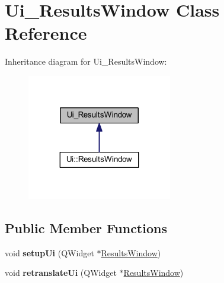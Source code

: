 \hypertarget{class_ui___results_window}{}\section{Ui\+\_\+\+Results\+Window Class Reference}
\label{class_ui___results_window}


Inheritance diagram for Ui\+\_\+\+Results\+Window\+:
\nopagebreak
\begin{figure}[H]
\begin{center}
\leavevmode
\includegraphics[width=179pt]{class_ui___results_window__inherit__graph}
\end{center}
\end{figure}
\subsection*{Public Member Functions}
\begin{DoxyCompactItemize}
\item 
\mbox{\label{class_ui___results_window_aed90c2de85fe8a5e2aad1c63b6e8af71}} 
void {\bfseries setup\+Ui} (Q\+Widget $\ast$\mbox{\hyperlink{class_results_window}{Results\+Window}})
\item 
\mbox{\label{class_ui___results_window_a373444cf96474236c90128a548afffae}} 
void {\bfseries retranslate\+Ui} (Q\+Widget $\ast$\mbox{\hyperlink{class_results_window}{Results\+Window}})
\end{DoxyCompactItemize}
